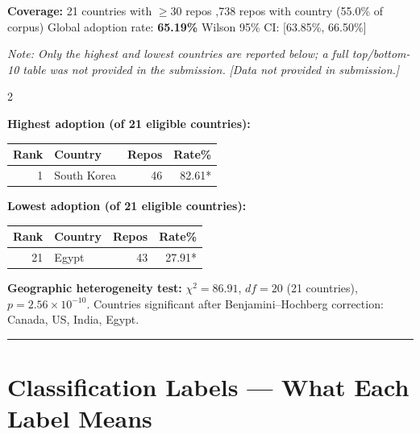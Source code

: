 \documentclass[10pt,a4paper]{article}
\begin{document}
\textbf{Coverage:} 21 countries with $\geq 30$ repos ,738 repos with country (55.0\% of corpus) \quad
Global adoption rate: \textbf{65.19\%} \quad
Wilson 95\% CI: [63.85\%, 66.50\%]

\vspace{4pt}
\textit{Note: Only the highest and lowest countries are reported below; a full top/bottom-10 table
was not provided in the submission.}
\textit{\small [Data not provided in submission.]}

\begin{multicols}{2}

\textbf{Highest adoption (of 21 eligible countries):}

\begin{tabular}{@{}rlrr@{}}
\toprule
Rank & Country & Repos & Rate\% \\
\midrule
1 & South Korea & 46 & 82.61* \\
\bottomrule
\end{tabular}

\columnbreak

\textbf{Lowest adoption (of 21 eligible countries):}

\begin{tabular}{@{}rlrr@{}}
\toprule
Rank & Country & Repos & Rate\% \\
\midrule
21 & Egypt & 43 & 27.91* \\
\bottomrule
\end{tabular}

\end{multicols}

\vspace{4pt}
\textbf{Geographic heterogeneity test:}
$\chi^2 = 86.91$, $df = 20$ (21 countries), $p = 2.56 \times 10^{-10}$.
Countries significant after Benjamini--Hochberg correction: Canada, US, India, Egypt.

\vspace{6pt}
\hrule
\vspace{6pt}

\section*{Classification Labels --- What Each Label Means}
\end{document}
